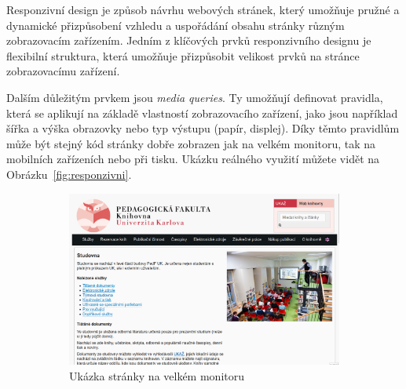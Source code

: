 \documentclass{csbulletin}
\begin{document}
Responzivní design je způsob návrhu webových stránek, který umožňuje
pružné a dynamické přizpůsobení vzhledu a uspořádání obsahu stránky
různým zobrazovacím zařízením. Jedním z klíčových prvků responzivního
designu je flexibilní struktura, která umožňuje přizpůsobit velikost
prvků na stránce zobrazovacímu zařízení.

Dalším důležitým prvkem jsou \textit{media queries}. 
Ty umožňují definovat
pravidla, která se aplikují na základě vlastností zobrazovacího
zařízení, jako jsou například šířka a výška obrazovky nebo typ výstupu (papír, displej). 
Díky těmto pravidlům může být stejný kód stránky dobře zobrazen jak na velkém
monitoru, tak na mobilních zařízeních nebo při tisku. Ukázku reálného využití 
můžete vidět na Obrázku~\ref{fig:responzivni}.


\begin{figure}[tbp]
\begin{subfigure}[t]{0.74\textwidth}
    \includegraphics[width=\textwidth]{img/pedf-web-big.png}
    \caption{Ukázka stránky na velkém monitoru}
\end{subfigure}
\hfill
\begin{subfigure}[t]{0.24\textwidth}

\end{subfigure}
\end{figure}
\end{document}
